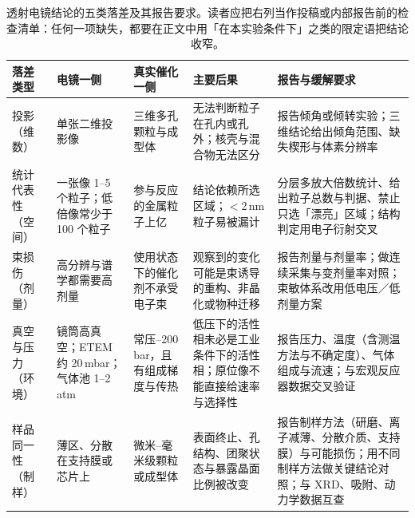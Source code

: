 \begin{table}[htbp]
\centering
\setlength{\tabcolsep}{4pt}
\small
\caption{透射电镜结论的五类落差及其报告要求。读者应把右列当作投稿或内部报告前的检查清单：任何一项缺失，都要在正文中用「在本实验条件下」之类的限定语把结论收窄。}
\label{tab:ch02c-gaps}
\begin{tabular}{@{}p{20mm}p{28mm}p{30mm}p{30mm}p{28mm}@{}}
\toprule
落差类型 & 电镜一侧 & 真实催化一侧 & 主要后果 & 报告与缓解要求 \\
\midrule
投影（维数） & 单张二维投影像 & 三维多孔颗粒与成型体 & 无法判断粒子在孔内或孔外；核壳与混合物无法区分 & 报告倾角或倾转实验；三维结论给出倾角范围、缺失楔形与体素分辨率 \\
\addlinespace
统计代表性（空间） & 一张像 1--5 个粒子；低倍像常少于 100 个粒子 & 参与反应的金属粒子上亿 & 结论依赖所选区域；$<$2\,nm 粒子易被漏计 & 分层多放大倍数统计、给出粒子总数与判据、禁止只选「漂亮」区域；结构判定用电子衍射交叉 \\
\addlinespace
束损伤（剂量） & 高分辨与谱学都需要高剂量 & 使用状态下的催化剂不承受电子束 & 观察到的变化可能是束诱导的重构、非晶化或物种迁移 & 报告剂量与剂量率；做连续采集与变剂量率对照；束敏体系改用低电压／低剂量方案 \\
\addlinespace
真空与压力（环境） & 镜筒高真空；ETEM 约 20\,mbar；气体池 1--2\,atm & 常压--200\,bar，且有组成梯度与传热 & 低压下的活性相未必是工业条件下的活性相；原位像不能直接给速率与选择性 & 报告压力、温度（含测温方法与不确定度）、气体组成与流速；与宏观反应器数据交叉验证 \\
\addlinespace
样品同一性（制样） & 薄区、分散在支持膜或芯片上 & 微米--毫米级颗粒或成型体 & 表面终止、孔结构、团聚状态与暴露晶面比例被改变 & 报告制样方法（研磨、离子减薄、分散介质、支持膜）与可能损伤；用不同制样方法做关键结论对照；与 XRD、吸附、动力学数据互查 \\
\bottomrule
\end{tabular}
\end{table}

